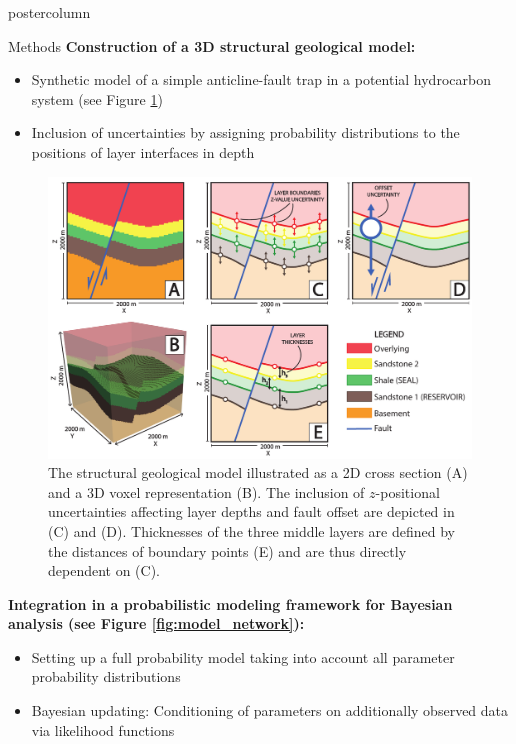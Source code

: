\documentclass{beamer}
\begin{document}
\begin{frame}
\begin{columns}
\begin{column}{.382\textwidth}
\begin{beamercolorbox}[center]{postercolumn}
\begin{minipage}{.98\textwidth}
{\begin{myblock}{Methods}
\textbf{Construction of a 3D structural geological model:}
	\begin{itemize}
	\item Synthetic model of a simple anticline-fault trap in a potential hydrocarbon system (see Figure \ref{fig:unc_lik})
	\item Inclusion of uncertainties by assigning probability distributions to the positions of layer interfaces in depth
	\end{itemize}							
								\vspace{0.5em}
								\begin{figure}
									\begin{minipage}{0.95\textwidth}
										\centering\includegraphics[width=1\textwidth]{figures/Uncertainties_Likelihoods}
										\caption{The structural geological model illustrated as a 2D cross section (A) and a 3D voxel representation (B). The inclusion of $z$-positional uncertainties affecting layer depths and fault offset are depicted in (C) and (D). Thicknesses of the three middle layers are defined by the distances of boundary points (E) and are thus directly dependent on (C).}
										\label{fig:unc_lik}
									\end{minipage}
								\end{figure}
\textbf{Integration in a probabilistic modeling framework for Bayesian analysis (see Figure \ref{fig:model_network}):}
	\begin{itemize}
	\item Setting up a full probability model taking into account all parameter probability distributions
	\item Bayesian updating: Conditioning of parameters on additionally observed data via likelihood functions

\end{itemize}
\end{myblock}}
\end{minipage}
\end{beamercolorbox}
\end{column}
\end{columns}
\end{frame}
\end{document}

